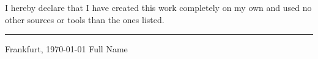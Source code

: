 \documentclass[twoside,11pt,titlepage,a4paper,english,bibliography=totocnumbered,listof=numbered]{scrbook}[2019/07/29]
\begin{document}
\noindent I hereby declare that I have created this work completely on my own and used no other sources or tools than the ones listed.

\vspace{30 mm}
\begin{flushright}

\rule{90mm}{1pt}

Frankfurt, \today \hspace{15 mm} Full Name
\end{flushright}
\clearpage

\cleardoublepage{}

\newpage



%
\thispagestyle{empty}

\tableofcontents{\thispagestyle{empty}}

\mainmatter








\backmatter

\listoftables
\listoffigures

\setwidesite{}		
\printbibliography


\begin{appendices}




\end{appendices}
\end{document}
